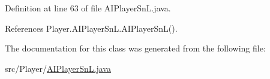 Definition at line 63 of file A\+I\+Player\+Sn\+L.\+java.



References Player.\+A\+I\+Player\+Sn\+L.\+A\+I\+Player\+Sn\+L().



The documentation for this class was generated from the following file\+:\begin{DoxyCompactItemize}
\item 
src/\+Player/\hyperlink{_a_i_player_sn_l_8java}{A\+I\+Player\+Sn\+L.\+java}\end{DoxyCompactItemize}
